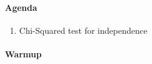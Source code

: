 \documentclass[10pt]{article}\usepackage[]{graphicx}\usepackage[]{color}
\begin{document}
\paragraph{Agenda}
\begin{enumerate}
  \itemsep0em
  \item Chi-Squared test for independence
\end{enumerate}


% 
% 
% 

\paragraph{Warmup}
\end{document}
